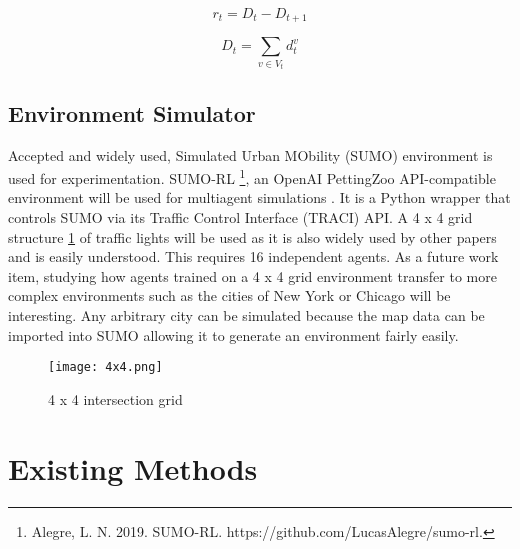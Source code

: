 \documentclass[letterpaper]{article} %
\begin{document}
\begin{equation}
r_t = D_t - D_{t+1}
\label{eq:cumulative_delay}
\end{equation}

\begin{equation}
D_t = \sum_{v \in V_t} d_t^v
\label{eq:wait_time_sum}
\end{equation}

\subsection{Environment Simulator}
Accepted and widely used, Simulated Urban MObility (SUMO) environment is used for experimentation\cite{ault2021reinforcement}.
SUMO-RL \footnote{Alegre, L. N. 2019. SUMO-RL. https://github.com/LucasAlegre/sumo-rl.}, an OpenAI PettingZoo API-compatible environment will be used for multiagent simulations \cite{terry2021pettingzoo}.
It is a Python wrapper that controls SUMO via its Traffic Control Interface (TRACI) API.
A 4 x 4 grid structure \ref{fig:intersection_grid} of traffic lights will be used as it is also widely used by other papers \cite{Almeida2022MultiagentRL} and is easily understood.
This requires 16 independent agents.
As a future work item, studying how agents trained on a 4 x 4 grid environment transfer to more complex environments such as the cities of New York or Chicago will be interesting.
Any arbitrary city can be simulated because the map data can be imported into SUMO allowing it to generate an environment fairly easily.

\begin{figure}[htbp]
  \centering
  \texttt{[image: 4x4.png]}
  \caption{4 x 4 intersection grid \cite{DBLP:journals/corr/abs-2004-04778}}
  \label{fig:intersection_grid}
\end{figure}

\section{Existing Methods}
\end{document}
